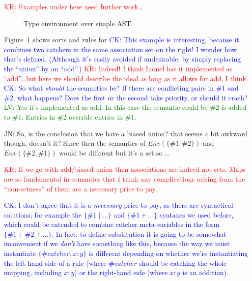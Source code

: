 \documentclass[letterpaper,11pt]{article}
\newcommand{\CK}[1]{\textcolor{blue}{CK: #1}}
\newcommand{\KR}[1]{\textcolor{red}{KR: #1}}
\newcommand{\LV}[1]{\textcolor{green}{LV: #1}}
\newcommand{\JN}[1]{\textcolor{orange!70!black}{JN: #1}}
\begin{document}
\KR{Examples under here need further work…}

\begin{figure}[h!t]
  \caption{Type environment over simple AST.}
  \label{fig:te}
\end{figure}

\begin{example}\label{ex:te}
  Figure~\ref{fig:te} shows sorts and rules for 
\CK{This example is interesting, because it combines two catchers in
the same association set on the right! I wonder how that's defined.
(Although it's easily avoided if undesirable, by simply replacing the
``union'' by an ``add''.)}
\KR{Indeed! I think Lionel has it implemented as ``add''…but here we should describe the ideal as
 long as it allows for add, I think.}
\CK{So what \emph{should} the semantics be?  If there are conflicting
 pairs in \#1 and \#2, what happens? Does the first or the second take
 priority, or should it crash?}
\LV{Yes it's implemented as add. In this case the semantic could
be \#2 is added to \#1. Entries in \#2 override entries in \#1.}

\JN{So, is the conclusion that we have a biased union? that seems a bit awkward though, doesn't it?
  Since then the semantics of $Env(\{\#1,\#2\})$ and $Env(\{\#2,\#1\})$ would be different but it's
  a set so \dots}

\KR{If we go with add/biased union then associations are indeed not sets. Maps are so fundamental in
  semantics that I think any complications arising from the ``non-setness'' of them are a necessary
  price to pay.}

\CK{I don't agree that it is a \emph{necessary} price to pay, as there are
  syntactical solutions; for example the $\{\#1 \mid \dots\}$ and $\{\#1 +
  \dots\}$ syntaxes we used before, which could be extended to combine
  catcher meta-variables in the form $\{\#1 + \#2 + \dots\}$.  In fact, to
  define substitution it is going to be somewhat inconvenient if we
  \emph{don't} have something like this, because the way we must
  instantiate $\{\#catcher, x : y\}$ is different depending on whether we're
  instantiating the left-hand side of a rule (where $\#catcher$ should be
  catching the whole mapping, including $x:y$) or the right-hand side (where
  $x:y$ is an addition).}

\end{example}
\end{document}
